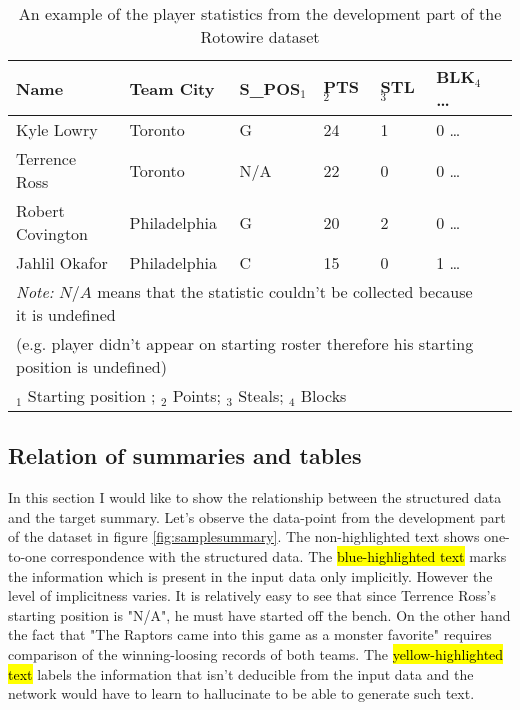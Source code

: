 \begin{table}[h!]
    \begin{tabular}{lllllll}
        \toprule
        Name             & Team City    & S\_POS$_1$ & PTS$_2$ & STL$_3$ & BLK$_4$        \dots \\
        \midrule
        Kyle Lowry       & Toronto      & G         & 24  & 1   & 0       \dots \\
        Terrence Ross    & Toronto      & N/A       & 22  & 0   & 0        \dots \\
        Robert Covington & Philadelphia & G         & 20  & 2   & 0        \dots \\
        Jahlil Okafor    & Philadelphia & C         & 15  & 0   & 1        \dots \\
        \bottomrule
        \multicolumn{6}{l}{\footnotesize \textit{Note:} $N/A$ means that the statistic couldn't be collected because it is undefined} \\
        \multicolumn{6}{l}{\footnotesize (e.g. player didn't appear on starting roster therefore his starting position is undefined)} \\
        \multicolumn{6}{l}{\footnotesize $_1$ Starting position ; $_2$ Points; $_3$ Steals; $_4$ Blocks}
    \end{tabular}
    \caption{\centering An example of the player statistics from the development part of the Rotowire dataset}\label{tab_player_stats}
\end{table}

\subsection{Relation of summaries and tables}

In this section I would like to show the relationship between the structured data and the target summary. Let's observe the data-point from the development part of the dataset in figure \ref{fig:samplesummary}. The non-highlighted text shows one-to-one correspondence with the structured data. The  \hl{blue-highlighted text} marks the information which is present in the input data only implicitly. However the level of implicitness varies. It is relatively easy to see that since Terrence Ross's starting position is "N/A", he must have started off the bench. On the other hand the fact that "The Raptors came into this game as a monster favorite" requires comparison of the winning-loosing records of both teams. The  \hl{yellow-highlighted text} labels the information that isn't deducible from the input data and the network would have to learn to hallucinate to be able to generate such text.

